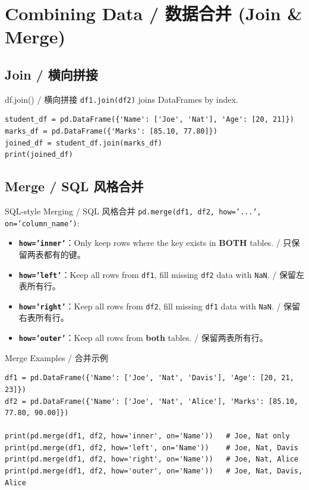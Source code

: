 \documentclass[11pt,a4paper]{article}
\begin{document}
\section{Combining Data / 数据合并 (Join \& Merge)}

\subsection{Join / 横向拼接}

\begin{examplebox}{df.join() / 横向拼接}
    \texttt{df1.join(df2)} joins DataFrames by index.
\begin{lstlisting}
student_df = pd.DataFrame({'Name': ['Joe', 'Nat'], 'Age': [20, 21]})
marks_df = pd.DataFrame({'Marks': [85.10, 77.80]})
joined_df = student_df.join(marks_df)
print(joined_df)
\end{lstlisting}
\end{examplebox}

\subsection{Merge / SQL 风格合并}

\begin{concept}{SQL-style Merging / SQL 风格合并}
    \texttt{pd.merge(df1, df2, how='...', on='column\_name')}:
    \begin{itemize}[itemsep=0.5em]
        \item \textbf{\texttt{how='inner'}}：Only keep rows where the key exists in \textbf{BOTH} tables. / 只保留两表都有的键。
        \item \textbf{\texttt{how='left'}}：Keep all rows from \texttt{df1}, fill missing \texttt{df2} data with \texttt{NaN}. / 保留左表所有行。
        \item \textbf{\texttt{how='right'}}：Keep all rows from \texttt{df2}, fill missing \texttt{df1} data with \texttt{NaN}. / 保留右表所有行。
        \item \textbf{\texttt{how='outer'}}：Keep all rows from \textbf{both} tables. / 保留两表所有行。
    \end{itemize}
\end{concept}

\begin{examplebox}{Merge Examples / 合并示例}
\begin{lstlisting}
df1 = pd.DataFrame({'Name': ['Joe', 'Nat', 'Davis'], 'Age': [20, 21, 23]})
df2 = pd.DataFrame({'Name': ['Joe', 'Nat', 'Alice'], 'Marks': [85.10, 77.80, 90.00]})

print(pd.merge(df1, df2, how='inner', on='Name'))   # Joe, Nat only
print(pd.merge(df1, df2, how='left', on='Name'))    # Joe, Nat, Davis
print(pd.merge(df1, df2, how='right', on='Name'))   # Joe, Nat, Alice
print(pd.merge(df1, df2, how='outer', on='Name'))   # Joe, Nat, Davis, Alice
\end{lstlisting}
\end{examplebox}
\end{document}
